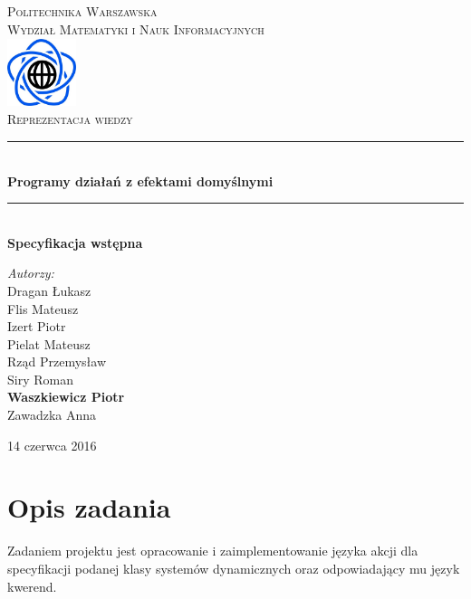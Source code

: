 \documentclass{article}
\begin{document}
\begin{titlepage}
\newcommand{\HRule}{\rule{\linewidth}{0.5mm}}
\newcommand{\Action}[1]{\textsc{#1}}
\center
\textsc{\LARGE Politechnika Warszawska}\\[0.3cm]
\textsc{\Large Wydział Matematyki i Nauk Informacyjnych}\\[0.6cm]
\includegraphics[width=2cm, height=2cm]{logo}\\[0.6cm]
\textsc{\Huge Reprezentacja wiedzy}\\[0.3cm]
\HRule \\[0.4cm]
{ \LARGE \bfseries Programy działań z efektami domyślnymi}\\[0.1cm]
 
\HRule \\[0.4cm]
{  \bfseries Specyfikacja wstępna}\\[1.2cm]
\begin{flushright}
\Large \emph{Autorzy:}\\[0.5cm]
Dragan Łukasz\\
Flis Mateusz\\
Izert Piotr\\
Pielat Mateusz\\
Rząd Przemysław\\
Siry Roman\\
\textbf{Waszkiewicz Piotr}\\
Zawadzka Anna\\[0.9cm]
\end{flushright}
\vfill
{\large 14 czerwca 2016}\\[1cm]
\end{titlepage}
\newpage
	
\newpage

\section{Opis zadania}

Zadaniem projektu jest opracowanie i zaimplementowanie języka akcji dla specyfikacji podanej klasy systemów dynamicznych oraz odpowiadający mu język kwerend.\\
\end{document}
